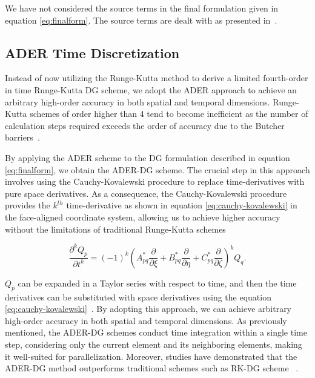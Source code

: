 \par We have not considered the source terms in the final formulation given in equation \ref{eq:finalform}. The source terms are dealt with as presented in~\parencite{10.1785/0120060253}.

\subsection[ADER Time Discretization]{ADER Time Discretization}

Instead of now utilizing the Runge-Kutta method to derive a limited fourth-order in time Runge-Kutta \ac{DG} scheme, we adopt the 
\ac{ADER} approach to achieve an arbitrary high-order accuracy in both spatial and temporal dimensions. Runge-Kutta schemes of order
higher than 4 tend to become inefficient as the number of calculation steps required exceeds the order of accuracy due to the Butcher barriers~\parencite{butcher1987numerical}.

\par By applying the \ac{ADER} scheme to the \ac{DG} formulation described in equation \ref{eq:finalform}, we obtain the \ac{ADER}-\ac{DG} scheme.
The crucial step in this approach involves using the Cauchy-Kovalewski procedure to replace time-derivatives with pure space derivatives.
As a consequence, the Cauchy-Kovalewski procedure provides the $k^{th}$ time-derivative as shown in equation \ref{eq:cauchy-kovalewski} in the face-aligned coordinate system, allowing us to
achieve higher accuracy without the limitations of traditional Runge-Kutta schemes

\begin{equation}
    \frac{\partial^k Q_p}{\partial t^k} = \left(-1\right)^k \left(A_{pq}^* \frac{\partial}{\partial \xi} + B_{pq}^* \frac{\partial}{\partial \eta} + C_{pq}^* \frac{\partial}{\partial \zeta}\right)^k Q_q .
    \label{eq:cauchy-kovalewski}
\end{equation}

$Q_p$ can be expanded in a Taylor series with respect to time, and then the time derivatives can be substituted with space derivatives
using the equation \ref{eq:cauchy-kovalewski}~\parencite[Sec. 3.2]{dumbser1}. By adopting this approach, we can achieve arbitrary high-order
accuracy in both spatial and temporal dimensions. As previously mentioned, the \ac{ADER}-\ac{DG} schemes conduct time integration
within a single time step, considering only the current element and its neighboring elements, making it well-suited for parallelization.
Moreover, studies have demonstrated that the \ac{ADER}-\ac{DG} method outperforms traditional schemes such as \ac{RK-DG} scheme ~\parencite{dumbser2005ader}.
